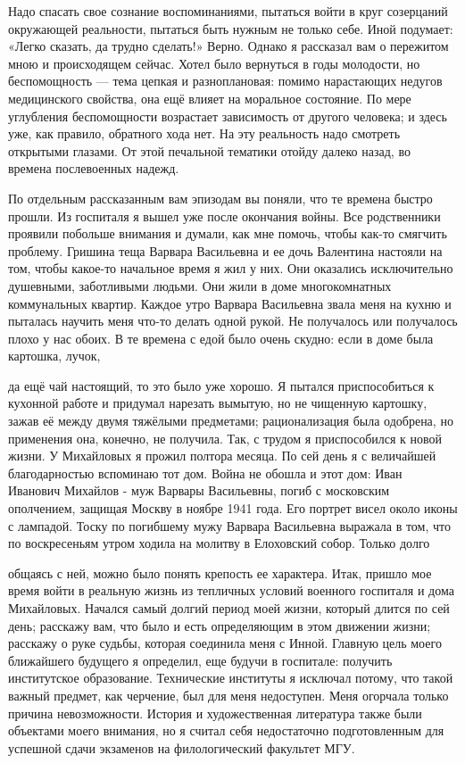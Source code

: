 \label{268-1}
Надо спасать свое сознание воспоминаниями, пытаться войти в круг созерцаний окружающей реальности, пытаться быть нужным не только себе. Иной подумает: «Легко сказать, да трудно сделать!» Верно. Однако я рассказал вам о пережитом мною и происходящем сейчас. Хотел было вернуться в годы молодости, но беспомощность — тема цепкая и разноплановая: помимо нарастающих недугов медицинского свойства, она ещё влияет на моральное состояние. По мере углубления беспомощности возрастает зависимость от другого человека; и здесь уже, как правило, обратного хода нет. На эту реальность надо смотреть открытыми глазами. От этой печальной тематики отойду далеко назад, во времена послевоенных надежд.

\label{269-1}
По отдельным рассказанным вам эпизодам вы поняли, что те времена быстро прошли. Из госпиталя я вышел уже после окончания войны. Все родственники проявили побольше внимания и думали, как мне помочь, чтобы как-то смягчить проблему. Гришина теща Варвара Васильевна и ее дочь Валентина настояли на том, чтобы какое-то начальное время я жил у них. Они оказались исключительно душевными, заботливыми людьми. Они жили в доме многокомнатных коммунальных квартир. Каждое утро Варвара Васильевна звала меня на кухню и пыталась научить меня что-то делать одной рукой. Не получалось или получалось плохо у нас обоих. В те времена с едой было очень скудно: если в доме была картошка, лучок,

\label{270-1}
да ещё чай настоящий, то это было уже хорошо. Я пытался приспособиться к кухонной работе и придумал нарезать вымытую, но не чищенную картошку, зажав её между двумя тяжёлыми предметами; рационализация была одобрена, но применения она, конечно, не получила. Так, с трудом я приспособился к новой жизни. У Михайловых я прожил полтора месяца. По сей день я с величайшей благодарностью вспоминаю тот дом. Война не обошла и этот дом: Иван Иванович Михайлов - муж Варвары Васильевны, погиб с московским ополчением, защищая Москву в ноябре 1941 года. Его портрет висел около иконы с лампадой. Тоску по погибшему мужу Варвара Васильевна выражала в том, что по воскресеньям утром ходила на молитву в Елоховский собор. Только долго

\label{271-1}
общаясь с ней, можно было понять крепость ее характера.
Итак, пришло мое время войти в реальную жизнь из тепличных условий военного госпиталя и дома Михайловых.
Начался самый долгий период моей жизни, который длится по сей день; расскажу вам, что было и есть определяющим в этом движении жизни; расскажу о руке судьбы, которая соединила меня с Инной.
Главную цель моего ближайшего будущего я определил, еще будучи в госпитале: получить институтское образование. Технические институты я исключал потому, что такой важный предмет, как черчение, был для меня недоступен. Меня огорчала только причина невозможности.
История и художественная литература также были объектами моего внимания, но я считал себя недостаточно подготовленным для успешной сдачи экзаменов на филологический факультет МГУ.

